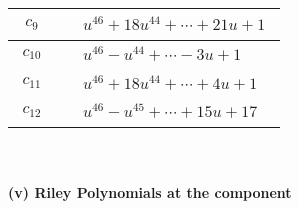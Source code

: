 \documentclass[1p]{elsarticle_modified}
\theoremstyle{definition}
\begin{document}
\begin{tabular}{m{50pt}|m{274pt}}
\hline $$\begin{aligned}c_{9}\end{aligned}$$&$\begin{aligned}
&u^{46}+18 u^{44}+\cdots+21 u+1
\end{aligned}$\\
\hline $$\begin{aligned}c_{10}\end{aligned}$$&$\begin{aligned}
&u^{46}- u^{44}+\cdots-3 u+1
\end{aligned}$\\
\hline $$\begin{aligned}c_{11}\end{aligned}$$&$\begin{aligned}
&u^{46}+18 u^{44}+\cdots+4 u+1
\end{aligned}$\\
\hline $$\begin{aligned}c_{12}\end{aligned}$$&$\begin{aligned}
&u^{46}- u^{45}+\cdots+15 u+17
\end{aligned}$\\
\hline
\end{tabular}\\~\\
\newpage\renewcommand{\arraystretch}{1}
\flushleft \textbf{(v) Riley Polynomials at the component}\newline \\
\end{document}
